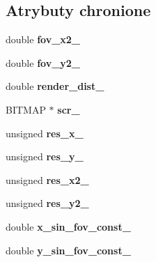 \subsection*{Atrybuty chronione}
\begin{DoxyCompactItemize}
\item 
double {\bfseries fov\+\_\+x2\+\_\+}\hypertarget{class_camera_ad6f9e802013ee6a2b213b9d10c98486d}{}\label{class_camera_ad6f9e802013ee6a2b213b9d10c98486d}

\item 
double {\bfseries fov\+\_\+y2\+\_\+}\hypertarget{class_camera_ad7cca2cccd8e80f609b4286b80790a32}{}\label{class_camera_ad7cca2cccd8e80f609b4286b80790a32}

\item 
double {\bfseries render\+\_\+dist\+\_\+}\hypertarget{class_camera_afa21bbf24f05d8de6f627c69c9483f51}{}\label{class_camera_afa21bbf24f05d8de6f627c69c9483f51}

\item 
B\+I\+T\+M\+AP $\ast$ {\bfseries scr\+\_\+}\hypertarget{class_camera_a894521c08c09d8aceafadb9e936f6078}{}\label{class_camera_a894521c08c09d8aceafadb9e936f6078}

\item 
unsigned {\bfseries res\+\_\+x\+\_\+}\hypertarget{class_camera_a2802feb57ae1946b07bbdba556fcbeb7}{}\label{class_camera_a2802feb57ae1946b07bbdba556fcbeb7}

\item 
unsigned {\bfseries res\+\_\+y\+\_\+}\hypertarget{class_camera_a03472c7407e3cc29e7c4b5917bfcd6ee}{}\label{class_camera_a03472c7407e3cc29e7c4b5917bfcd6ee}

\item 
unsigned {\bfseries res\+\_\+x2\+\_\+}\hypertarget{class_camera_a42e9c3892b3afc9a24001a3c537da592}{}\label{class_camera_a42e9c3892b3afc9a24001a3c537da592}

\item 
unsigned {\bfseries res\+\_\+y2\+\_\+}\hypertarget{class_camera_a0a7acab770bd82600f504cd0325b3b00}{}\label{class_camera_a0a7acab770bd82600f504cd0325b3b00}

\item 
double {\bfseries x\+\_\+sin\+\_\+fov\+\_\+const\+\_\+}\hypertarget{class_camera_a7ffda0b88dafdbd3156d59bbec896bd0}{}\label{class_camera_a7ffda0b88dafdbd3156d59bbec896bd0}

\item 
double {\bfseries y\+\_\+sin\+\_\+fov\+\_\+const\+\_\+}\hypertarget{class_camera_a6489f19c9ae8cb252513bee7c76ea922}{}\label{class_camera_a6489f19c9ae8cb252513bee7c76ea922}


\end{DoxyCompactItemize}
